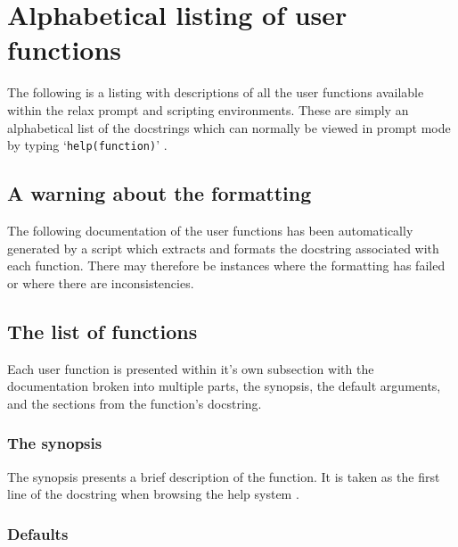 
\chapter{Alphabetical listing of user functions}

The following is a listing with descriptions of all the user functions  available within the relax prompt and scripting environments.  These are simply an alphabetical list of the docstrings which can normally be viewed in prompt mode by typing `\texttt{help(function)}' .





\section{A warning about the formatting}

The following documentation of the user functions  has been automatically generated by a script which extracts and formats the docstring associated with each function.  There may therefore be instances where the formatting has failed or where there are inconsistencies.




\section{The list of functions}

Each user function  is presented within it's own subsection with the documentation broken into multiple parts, the synopsis, the default arguments, and the sections from the function's docstring.


\subsection{The synopsis}

The synopsis presents a brief description of the function.  It is taken as the first line of the docstring when browsing the help system .


\subsection{Defaults}

